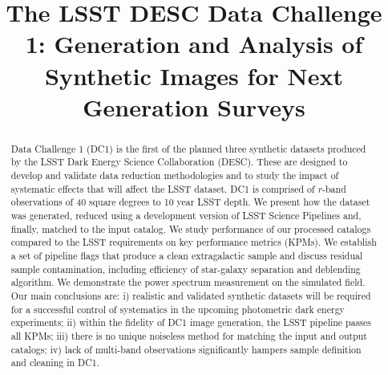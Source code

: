 \documentclass[twocolumn]{aastex62}
\newcommand{\as}[1]{{\textcolor{magenta}{{\textbf (AS: #1)}}}}
\begin{document}
\title[LSST DESC DC1]{The LSST DESC Data Challenge 1: Generation and Analysis of Synthetic Images for Next Generation Surveys }


\begin{abstract}
  Data Challenge 1 (DC1) is the first of the planned three synthetic
  datasets produced by the LSST Dark Energy Science Collaboration
  (DESC). These are designed to develop and validate data reduction
  methodologies and to study the impact of systematic effects that
  will affect the LSST dataset. DC1 is comprised of $r$-band
  observations of 40 square degrees to 10 year LSST depth. We present
  how the dataset was generated, reduced using a development version of
  LSST Science Pipelines and, finally, matched to the input catalog. We
  study performance of our processed catalogs compared to the
  LSST requirements on key performance metrics (KPMs). We establish a
  set of pipeline flags that produce a clean extragalactic sample and
  discuss residual sample contamination, including efficiency of
  star-galaxy separation and deblending algorithm. We demonstrate the
  power spectrum measurement on the simulated field. Our main
  conclusions are: i) realistic and validated synthetic datasets will
  be required for a successful control of systematics in the upcoming
  photometric dark energy experiments; ii) within the fidelity of DC1
  image generation, the LSST pipeline passes all KPMs;
   iii) there is no unique noiseless method for matching the input and output
  catalogs; iv) lack of multi-band observations significantly hampers
  sample definition and cleaning in DC1.

  


\end{abstract}
\end{document}
